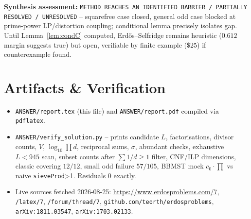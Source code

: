 \documentclass[11pt,a4paper]{article}
\theoremstyle{plain}
\theoremstyle{definition}
\theoremstyle{remark}
\newcommand{\cO}{c_{0}}
\begin{document}
\textbf{Synthesis assessment:} \texttt{METHOD REACHES AN IDENTIFIED BARRIER / PARTIALLY RESOLVED / UNRESOLVED} -- squarefree case closed, general odd case blocked at prime-power LP/distortion coupling; conditional lemma precisely isolates gap. Until Lemma~\ref{lem:condC} computed, Erd\H{o}s--Selfridge remains heuristic ($0.612$ margin suggests true) but open, verifiable by finite example ($\$$25) if counterexample found.

\section*{Artifacts \& Verification}

\begin{itemize}
\item \texttt{ANSWER/report.tex} (this file) and \texttt{ANSWER/report.pdf} compiled via \texttt{pdflatex}.
\item \texttt{ANSWER/verify\_solution.py} -- prints candidate $L$, factorisations, divisor counts, $V$, $\log_{10}\prod d$, reciprocal sums, $\sigma$, abundant checks, exhaustive $L<945$ scan, subset counts after $\sum1/d\ge1$ filter, CNF/ILP dimensions, classic covering $12/12$, small odd failure $57/105$, BBMST mock $\cO\cdot\prod$ vs naive \texttt{sieveProd}>1. Residuals $0$ exactly.
\item Live sources fetched 2026-08-25: \url{https://www.erdosproblems.com/7}, \texttt{/latex/7}, \texttt{/forum/thread/7}, \texttt{github.com/teorth/erdosproblems}, \texttt{arXiv:1811.03547}, \texttt{arXiv:1703.02133}.
\end{itemize}
\end{document}
